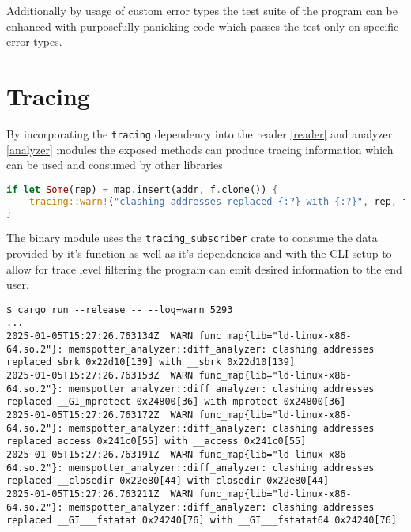 Additionally by usage of custom error types the test suite of the program can be enhanced with purposefully panicking code which passes the test only on specific error types.

\section{Tracing}

By incorporating the \verb|tracing| \cite{tokio-rs_team_tokio-rstracing_2024} dependency into the reader \ref{reader} and analyzer \ref{analyzer} modules the exposed methods can produce tracing information which can be used and consumed by other libraries

\begin{lstlisting}[language=Rust, caption="Code fragment showcasing conditionally emiting a warning"]
if let Some(rep) = map.insert(addr, f.clone()) {
    tracing::warn!("clashing addresses replaced {:?} with {:?}", rep, f);
}
\end{lstlisting}

The binary module uses the \verb|tracing_subscriber| \cite{tokio-rs_team_tokiotracingtracing-subscriber_2024} crate to consume the data provided by it's function as well as it's dependencies and with the CLI setup to allow for trace level filtering the program can emit desired information to the end user.

\begin{lstlisting}[breaklines=true, caption="Fraction of the warnings emitted by the program with the log setting at warning level"]
$ cargo run --release -- --log=warn 5293
...
2025-01-05T15:27:26.763134Z  WARN func_map{lib="ld-linux-x86-64.so.2"}: memspotter_analyzer::diff_analyzer: clashing addresses replaced sbrk 0x22d10[139] with __sbrk 0x22d10[139]
2025-01-05T15:27:26.763153Z  WARN func_map{lib="ld-linux-x86-64.so.2"}: memspotter_analyzer::diff_analyzer: clashing addresses replaced __GI_mprotect 0x24800[36] with mprotect 0x24800[36]
2025-01-05T15:27:26.763172Z  WARN func_map{lib="ld-linux-x86-64.so.2"}: memspotter_analyzer::diff_analyzer: clashing addresses replaced access 0x241c0[55] with __access 0x241c0[55]
2025-01-05T15:27:26.763191Z  WARN func_map{lib="ld-linux-x86-64.so.2"}: memspotter_analyzer::diff_analyzer: clashing addresses replaced __closedir 0x22e80[44] with closedir 0x22e80[44]
2025-01-05T15:27:26.763211Z  WARN func_map{lib="ld-linux-x86-64.so.2"}: memspotter_analyzer::diff_analyzer: clashing addresses replaced __GI___fstatat 0x24240[76] with __GI___fstatat64 0x24240[76]
\end{lstlisting}
